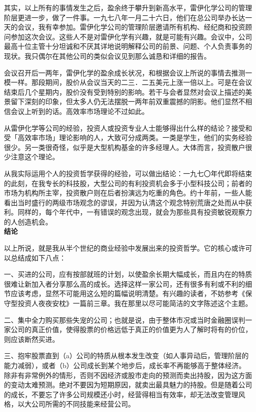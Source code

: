 \documentclass[UTF8,a4paper,zihao=-4,fontset = windows]{ctexart} %
\begin{document}
其实，以上所有的事情发生之后，盈余终于攀升到新高水平，雷伊化学公司的管理阶层更进一步，做了一件事。一九七八年一月二十六日，他们在总公司举办长达一天的会议，我有幸参加。雷伊化学公司的管理阶层邀请所有机构、经纪商和投资顾问参加这次会议。这些人不是对雷伊化学有兴趣，就是可能有兴趣。会议中，公司最高十位主管十分坦诚和不厌其详地说明解释公司的前景、问题、个人负责事务的现状。我只偶尔在其他公司的类似会议见到那么诚恳和详细的报告。

会议召开后一两年，雷伊化学的盈余成长状况，和根据会议上所说的事情去推测一模一样。那段期间，股价从会议当天的二三．二五美元上涨一倍以上。可是在会议结束后几个星期内，股价没有受到特别的影响。若干与会者显然对会议上描述的美景留下深刻的印象，但太多人仍无法摆脱一两年前双重震撼的阴影。他们显然不相信会议上听到的话。高效率市场理论不过如此。

从雷伊化学等公司的经验，投资人或投资专业人士能够得出什么样的结论？接受和受「高效率市场」理论影响的人，大致可分成两类。一类是学生，他们的实务经验很少。另一类很奇怪，似乎是大型机构基金的许多经理人。大体而言，投资散户很少注意这个理论。

从我实际运用个人的投资哲学获得的经验，可以做出结论：一九七〇年代即将结束的此刻，在我专长的科技股，大型公司的有利投资机会多于小型科技公司；前者的市场为机构所主宰，投资散户则在后者扮演远为吃重的角色。约十年前，一些人能看出当时盛行的两级市场观念的谬误，并因为认清这个观念特别荒唐之处而从中获利。同样的，每个年代中，一有错误的观念出现，就会为那些具有投资敏锐观察力的人创造机会。
\\

\textbf{结论}


以上所说，就是我从半个世纪的商业经验中发展出来的投资哲学。它的核心或许可以总结成如下八点：


一、买进的公司，应有按部就班的计划，以使盈余长期大幅成长，而且内在的特质很难让新加入者分享那么高的成长。选择这样一家公司，还有很多有利或不利的细节应该考虑，显然不可能用这么短的篇幅说明清楚。有兴趣的读者，不妨参考《保守型投资人夜夜安枕》一篇前三章。我在那里以尽可能简洁的文字陈述这个主题。

二、集中全力购买那些失宠的公司；也就是说，由于整体市况或当时金融圈误判一家公司的真正价值，使得股票的价格远低于真正的价值更为人了解时将有的价位，则应该断然买进。

三、抱牢股票直到（a）公司的特质从根本发生改变（如人事异动后，管理阶层的能力减弱），或者（b）公司成长到某个地步后，成长率不再能够高于整体经济。除非有非常例外的情形，否则不因经济或股市走向的预测而卖出持股，因为这方面的变动太难预测。绝对不要因为短期原因，就卖出最具魅力的持股。但是随着公司的成长，不要忘了许多公司规模还小时，经营得相当有效率，却无法改变管理风格，以大公司所需的不同技能来经营公司。
\end{document}
